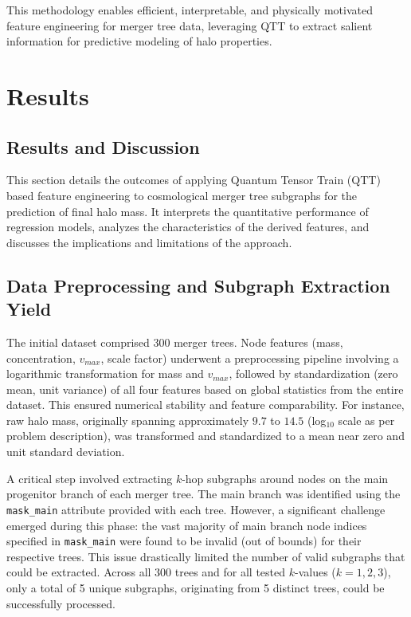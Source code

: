 \documentclass[twocolumn]{aastex631}
\begin{document}
This methodology enables efficient, interpretable, and physically motivated feature engineering for merger tree data, leveraging QTT to extract salient information for predictive modeling of halo properties.

\section{Results}
\label{sec:results}
\subsection{Results and Discussion}

This section details the outcomes of applying Quantum Tensor Train (QTT) based feature engineering to cosmological merger tree subgraphs for the prediction of final halo mass. It interprets the quantitative performance of regression models, analyzes the characteristics of the derived features, and discusses the implications and limitations of the approach.

\subsection{Data Preprocessing and Subgraph Extraction Yield}

The initial dataset comprised 300 merger trees. Node features (mass, concentration, $v_{max}$, scale factor) underwent a preprocessing pipeline involving a logarithmic transformation for mass and $v_{max}$, followed by standardization (zero mean, unit variance) of all four features based on global statistics from the entire dataset. This ensured numerical stability and feature comparability. For instance, raw halo mass, originally spanning approximately $9.7$ to $14.5$ (log$_{10}$ scale as per problem description), was transformed and standardized to a mean near zero and unit standard deviation.

A critical step involved extracting $k$-hop subgraphs around nodes on the main progenitor branch of each merger tree. The main branch was identified using the \texttt{mask\_main} attribute provided with each tree. However, a significant challenge emerged during this phase: the vast majority of main branch node indices specified in \texttt{mask\_main} were found to be invalid (out of bounds) for their respective trees. This issue drastically limited the number of valid subgraphs that could be extracted. Across all 300 trees and for all tested $k$-values ($k=1, 2, 3$), only a total of 5 unique subgraphs, originating from 5 distinct trees, could be successfully processed.
\end{document}
